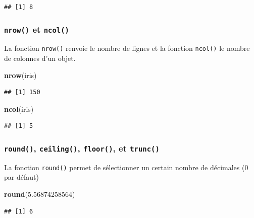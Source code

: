 \documentclass[]{book}
\newenvironment{Shaded}{\begin{snugshade}}{\end{snugshade}}
\newcommand{\FloatTok}[1]{\textcolor[rgb]{0.00,0.00,0.81}{#1}}
\newcommand{\KeywordTok}[1]{\textcolor[rgb]{0.13,0.29,0.53}{\textbf{#1}}}
\newcommand{\NormalTok}[1]{#1}
\begin{document}
\begin{verbatim}
## [1] 8
\end{verbatim}

\hypertarget{l015nrow}{%
\subsubsection{\texorpdfstring{\texttt{nrow()} et \texttt{ncol()}}{nrow() et ncol()}}\label{l015nrow}}

La fonction \texttt{nrow()} renvoie le nombre de lignes et la fonction \texttt{ncol()} le nombre de colonnes d'un objet.

\begin{Shaded}
\begin{Highlighting}[]
\KeywordTok{nrow}\NormalTok{(iris)}
\end{Highlighting}
\end{Shaded}

\begin{verbatim}
## [1] 150
\end{verbatim}

\begin{Shaded}
\begin{Highlighting}[]
\KeywordTok{ncol}\NormalTok{(iris)}
\end{Highlighting}
\end{Shaded}

\begin{verbatim}
## [1] 5
\end{verbatim}

\hypertarget{l015round}{%
\subsubsection{\texorpdfstring{\texttt{round()}, \texttt{ceiling()}, \texttt{floor()}, et \texttt{trunc()}}{round(), ceiling(), floor(), et trunc()}}\label{l015round}}

La fonction \texttt{round()} permet de sélectionner un certain nombre de décimales (0 par défaut)

\begin{Shaded}
\begin{Highlighting}[]
\KeywordTok{round}\NormalTok{(}\FloatTok{5.56874258564}\NormalTok{)}
\end{Highlighting}
\end{Shaded}

\begin{verbatim}
## [1] 6
\end{verbatim}
\end{document}
